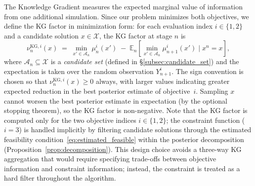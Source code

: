 \documentclass[12pt]{article}
\theoremstyle{plain}
\theoremstyle{definition}
\theoremstyle{remark}
\begin{document}
The Knowledge Gradient measures the expected marginal value of information from one additional simulation.  Since our problem minimizes both objectives, we define the KG factor in minimization form: for each evaluation index $i \in \{1, 2\}$ and a candidate solution $x \in \mathcal{X}$, the KG factor at stage $n$ is
\begin{equation}\label{eq:KG_factor}
  \nu^{\mathrm{KG},i}_n(x) \;=\; \min_{x' \in \mathcal{A}_n} \mu^i_n(x')
  \;-\;
  \mathbb{E}_n\!\left[\min_{x' \in \mathcal{A}_n} \mu^i_{n+1}(x') \;\Big|\; x^n = x\right],
\end{equation}
where $\mathcal{A}_n \subseteq \mathcal{X}$ is a \emph{candidate set} (defined in \S\ref{subsec:candidate_set}) and the expectation is taken over the random observation $Y^i_{n+1}$.  The sign convention is chosen so that $\nu^{\mathrm{KG},i}_n(x) \geq 0$ always, with larger values indicating greater expected reduction in the best posterior estimate of objective~$i$.  Sampling $x$ cannot worsen the best posterior estimate in expectation (by the optional stopping theorem), so the KG factor is non-negative.  Note that the KG factor is computed only for the two objective indices $i \in \{1,2\}$; the constraint function ($i=3$) is handled implicitly by filtering candidate solutions through the estimated feasibility condition~\eqref{eq:estimated_feasible} within the posterior decomposition (Proposition~\ref{prop:decomposition}).  This design choice avoids a three-way KG aggregation that would require specifying trade-offs between objective information and constraint information; instead, the constraint is treated as a hard filter throughout the algorithm.
\end{document}
